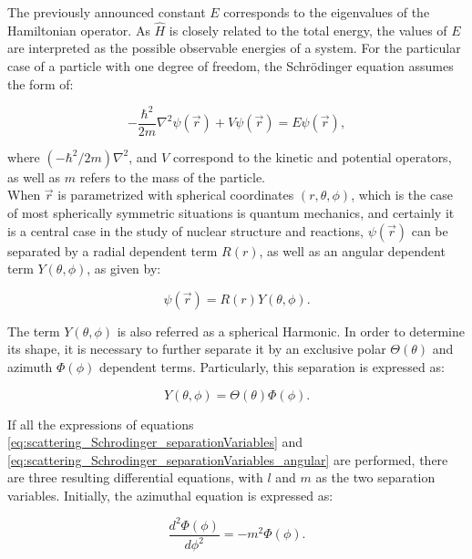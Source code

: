\documentclass[openany]{book}
\begin{document}
The previously announced constant $E$ corresponds to the eigenvalues of the Hamiltonian operator. As $\hat H$ is closely related to the total energy, the values of $E$ are interpreted as the possible observable energies of a system. For the particular case of a particle with one degree of freedom, the Schrödinger equation assumes the form of:

\begin{equation}\label{eq:scattering_Schrodinger_timeIndependent_point}
	-\frac{\hbar^2}{2m} \nabla^2 \psi (\vec r) + V \psi (\vec r)  = E \psi (\vec r),
\end{equation}

where $(-\hbar^2/2m) \nabla^2$, and $V$ correspond to the kinetic and potential operators, as well as $m$ refers to the mass of the particle. \\

When $\vec r$ is parametrized with spherical coordinates $(r, \theta, \phi)$, which is the case of most spherically symmetric situations is quantum mechanics, and certainly it is a central case in the study of nuclear structure and reactions, $\psi(\vec r)$ can be separated by a radial dependent term  $R(r)$, as well as an angular dependent term $Y(\theta, \phi)$, as given by:

\begin{equation}\label{eq:scattering_Schrodinger_separationVariables}
	\psi(\vec r) = R(r) Y(\theta, \phi).
\end{equation}

The term $Y(\theta, \phi)$ is also referred as a spherical Harmonic. In order to determine its shape, it is necessary to further separate it by an exclusive polar $\Theta(\theta)$ and azimuth $\Phi(\phi)$ dependent terms. Particularly, this separation is expressed as:

\begin{equation}\label{eq:scattering_Schrodinger_separationVariables_angular}
	Y(\theta, \phi) = \Theta (\theta) \Phi (\phi).
\end{equation}

If all the expressions of equations \ref{eq:scattering_Schrodinger_separationVariables} and \ref{eq:scattering_Schrodinger_separationVariables_angular} are performed, there are three resulting differential equations, with $l$ and $m$ as the two separation variables. Initially, the azimuthal equation is expressed as:

\begin{equation}\label{eq:scattering_Schrodinger_azimuthal}
	\frac{d^2\Phi(\phi)}{d\phi^2}  = -m^2 \Phi(\phi).
\end{equation}
\end{document}
